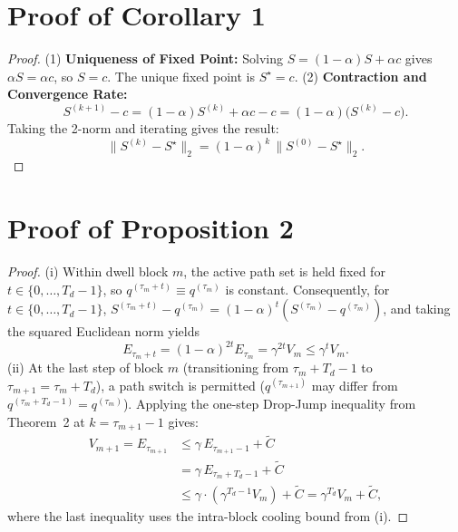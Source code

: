 \documentclass[11pt]{article}
\newcommand{\rev}[1]{#1}
\newenvironment{IEEEproof}{\begin{proof}}{\end{proof}}
\begin{document}
\section{Proof of Corollary 1}
\label{app:proof_cor_local_convergence}
\begin{IEEEproof}
(1) \textbf{Uniqueness of Fixed Point:} Solving $S=(1-\alpha)S+\alpha c$ gives $\alpha S=\alpha c$, so $S=c$. The unique fixed point is $S^\star=c$.
(2) \textbf{Contraction and Convergence Rate:}
\begin{equation}
S^{(k+1)}-c = (1-\alpha)S^{(k)}+\alpha c-c = (1-\alpha)\big(S^{(k)}-c\big).
\end{equation}
Taking the 2-norm and iterating gives the result:
\begin{equation}
\|S^{(k)}-S^\star\|_2 = (1-\alpha)^k\,\|S^{(0)}-S^\star\|_2.
\end{equation}
\end{IEEEproof}

\section{Proof of Proposition 2}
\label{app:proof_prop_block_dynamics}
\begin{IEEEproof}
\rev{(i) Within dwell block $m$, the active path set is held fixed for $t \in \{0, \dots, T_d-1\}$, so $q^{(\tau_m+t)} \equiv q^{(\tau_m)}$ is constant. Consequently, for $t \in \{0, \dots, T_d-1\}$, $S^{(\tau_m+t)} - q^{(\tau_m)} = (1-\alpha)^t (S^{(\tau_m)} - q^{(\tau_m)})$, and taking the squared Euclidean norm yields
\begin{equation}
E_{\tau_m+t} = (1-\alpha)^{2t} E_{\tau_m} = \gamma^{2t} V_m \le \gamma^t V_m.
\end{equation}
(ii) At the last step of block $m$ (transitioning from $\tau_m + T_d - 1$ to $\tau_{m+1} = \tau_m + T_d$), a path switch is permitted ($q^{(\tau_{m+1})}$ may differ from $q^{(\tau_m + T_d - 1)} = q^{(\tau_m)}$). Applying the one-step Drop-Jump inequality from Theorem~2 at $k = \tau_{m+1}-1$ gives:}
\begin{equation}
\begin{split}
V_{m+1} = E_{\tau_{m+1}} & \le \gamma\,E_{\tau_{m+1}-1} + \tilde C \\
& = \gamma\,E_{\tau_m+T_d-1} + \tilde C \\
& \le \gamma \cdot (\gamma^{T_d-1}V_m) + \tilde C = \gamma^{T_d}V_m + \tilde C,
\end{split}
\end{equation}
where the last inequality uses the intra-block cooling bound from (i).
\end{IEEEproof}
\end{document}
